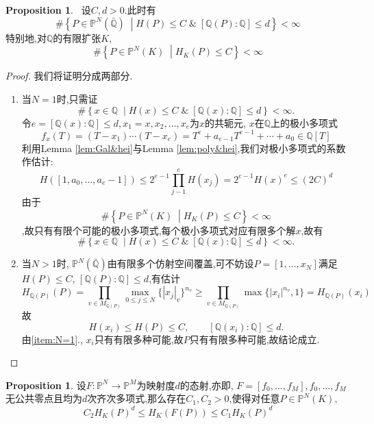 \documentclass[12pt,A4paper,oneside,reqno]{amsart}
\numberwithin{equation}{section}
\theoremstyle{definition}
\newtheorem{proposition}[theorem]{Proposition}
\theoremstyle{plain}
\theoremstyle{plain}
\numberwithin{equation}{section}
\theoremstyle{remark}
\begin{document}
\begin{proposition}\
	设$C,d>0$.此时有
	$$\#\left\{P \in \mathbb{P}^N(\bar{\mathbb{Q}})\;\middle|H(P) \leqslant C \;\&\; [\mathbb{Q}(P):\mathbb{Q}]\leqslant d \right\} < \infty$$
	特别地,对$\mathbb{Q}$的有限扩张$K$,
	$$\#\left\{P \in \mathbb{P}^N(K)\;\middle|H_K(P) \leqslant C  \right\} < \infty$$
\end{proposition}
\begin{proof}我们将证明分成两部分.
	\begin{enumerate}[1.]
		\item \label{item:N=1}	当$N=1$时,只需证
		$$\#\left\{x \in \mathbb{Q}\;\middle|H(x) \leqslant C \;\&\; [\mathbb{Q}(x):\mathbb{Q}]\leqslant d \right\} < \infty.$$
		令$e=[\mathbb{Q}(x):\mathbb{Q}]\leqslant d, x_1=x,x_2,\ldots, x_e$为$x$的共轭元, $x$在$\mathbb{Q}$上的极小多项式
		$$f_x(T)=(T-x_1)\cdots (T-x_e)=T^e+a_{e-1}T^{e-1}+\cdots +a_0 \in \mathbb{Q}[T]$$
		利用Lemma \ref{lem:Gal&hei}与Lemma \ref{lem:poly&hei},我们对极小多项式的系数作估计:
		$$H([1,a_0, \ldots , a_e-1]) \leqslant 2^{e-1}\prod_{j-1}^{e}H(x_j)=2^{e-1}H(x)^e \leqslant (2C)^d$$
		由于$$\#\left\{P \in \mathbb{P}^N(K)\;\middle|H_K(P) \leqslant C  \right\} < \infty$$,故只有有限个可能的极小多项式,每个极小多项式对应有限多个解$x$,故有
		$$\#\left\{x \in \mathbb{Q}\;\middle|H(x) \leqslant C \;\&\; [\mathbb{Q}(x):\mathbb{Q}]\leqslant d \right\} < \infty.$$
		\item 当$N>1$时, $\mathbb{P}^N(\bar{\mathbb{Q}})$由有限多个仿射空间覆盖,可不妨设$P=[1,\ldots,x_N]$满足$H(P) \leqslant C$, $[\mathbb{Q}(P):\mathbb{Q}] \leqslant d$,有估计
		$$H_{\mathbb{Q}(P)}(P)=\prod_{v \in M_{\mathbb{Q}(P)}}\max_{0 \leqslant j \leqslant N} \{|x_j|_v\}^{n_v} \geqslant \prod_{v \in M_{\mathbb{Q}(P)}}\max\{|x_i|^{n_v},1\} =H_{\mathbb{Q}(P)}(x_i)$$
		故
		$$H(x_i) \leqslant H(P) \leqslant C, \qquad [\mathbb{Q}(x_i):\mathbb{Q}]\leqslant d.$$
		由\ref{item:N=1}., $x_i$只有有限多种可能,故$P$只有有限多种可能,故结论成立.
	\end{enumerate}
\end{proof}
\begin{proposition}\label{prop:map&hei}
	设$F:\mathbb{P}^N \longrightarrow \mathbb{P}^M$为映射度$d$的态射,亦即, $F=[f_0, \ldots , f_M], f_0, \ldots , f_M$无公共零点且均为$d$次齐次多项式,那么存在$C_1,C_2>0$,使得对任意$P \in \mathbb{P}^N(K), $
	$$C_2H_K(P)^d \leqslant H_K(F(P)) \leqslant C_1H_K(P)^d$$
\end{proposition}
\end{document}
